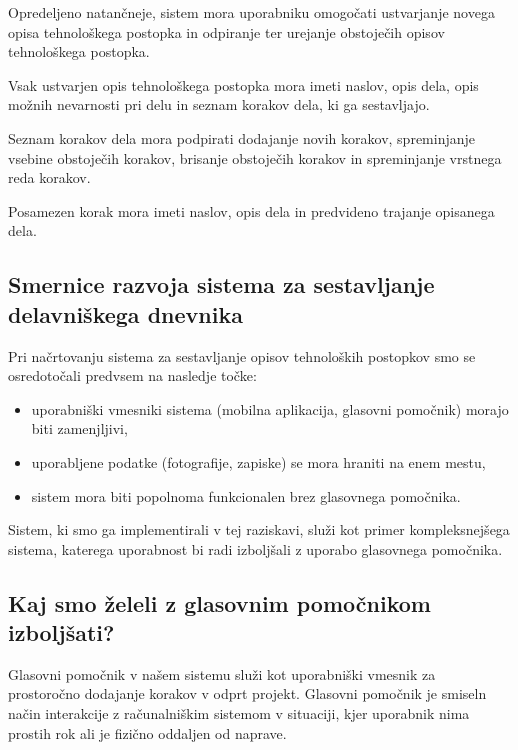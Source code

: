 \documentclass[a4paper, 12pt]{book}
\begin{document}
Opredeljeno natančneje, sistem mora uporabniku omogočati ustvarjanje novega opisa tehnološkega postopka in odpiranje ter urejanje obstoječih opisov tehnološkega postopka.

Vsak ustvarjen opis tehnološkega postopka mora imeti naslov, opis dela, opis možnih nevarnosti pri delu in seznam korakov dela, ki ga sestavljajo.

Seznam korakov dela mora podpirati dodajanje novih korakov, spreminjanje vsebine obstoječih korakov, brisanje obstoječih korakov in spreminjanje vrstnega reda korakov.

Posamezen korak mora imeti naslov, opis dela in predvideno trajanje opisanega dela.



\subsection{Smernice razvoja sistema za sestavljanje delavniškega dnevnika}

Pri načrtovanju sistema za sestavljanje opisov tehnoloških postopkov smo se osredotočali predvsem na nasledje točke:
\begin{itemize}
	\item uporabniški vmesniki sistema (mobilna aplikacija, glasovni pomočnik) morajo biti zamenjljivi,
	\item uporabljene podatke (fotografije, zapiske) se mora hraniti na enem mestu,
	\item sistem mora biti popolnoma funkcionalen brez glasovnega pomočnika.
\end{itemize}

Sistem, ki smo ga implementirali v tej raziskavi, služi kot primer kompleksnejšega sistema, katerega uporabnost bi radi izboljšali z uporabo glasovnega pomočnika.


\subsection{Kaj smo želeli z glasovnim pomočnikom izboljšati?}

Glasovni pomočnik v našem sistemu služi kot uporabniški vmesnik za prostoročno dodajanje korakov v odprt projekt.
Glasovni pomočnik je smiseln način interakcije z računalniškim sistemom v situaciji, kjer uporabnik nima prostih rok ali je fizično oddaljen od naprave.
\end{document}
